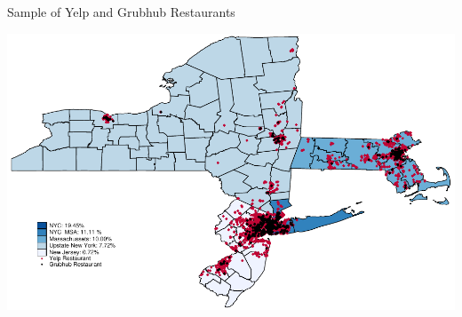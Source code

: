 \documentclass[xcolor=table]{beamer}
\begin{document}
\begin{spacing}{1.2}


\begin{frame}{Sample of Yelp and Grubhub Restaurants}

\centering
\includegraphics[scale=.65]{map_yelp.pdf}

\end{frame}


\end{spacing}
\end{document}
